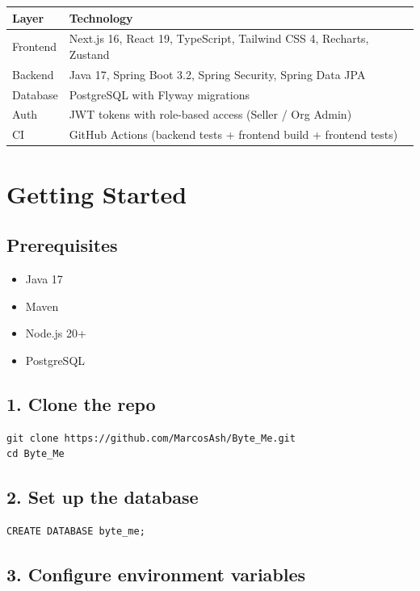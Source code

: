 \documentclass[a4paper,11pt]{article}
\begin{document}
\begin{tabular}{l l}
\toprule
Layer & Technology \\
\midrule
Frontend & Next.js 16, React 19, TypeScript, Tailwind CSS 4, Recharts, Zustand \\
Backend & Java 17, Spring Boot 3.2, Spring Security, Spring Data JPA \\
Database & PostgreSQL with Flyway migrations \\
Auth & JWT tokens with role-based access (Seller / Org Admin) \\
CI & GitHub Actions (backend tests + frontend build + frontend tests) \\
\bottomrule
\end{tabular}

\section{Getting Started}

\subsection{Prerequisites}

\begin{itemize}
  \item Java 17
  \item Maven
  \item Node.js 20+
  \item PostgreSQL
\end{itemize}

\subsection{1. Clone the repo}

\begin{lstlisting}
git clone https://github.com/MarcosAsh/Byte_Me.git
cd Byte_Me
\end{lstlisting}

\subsection{2. Set up the database}

\begin{lstlisting}
CREATE DATABASE byte_me;
\end{lstlisting}

\subsection{3. Configure environment variables}
\end{document}
